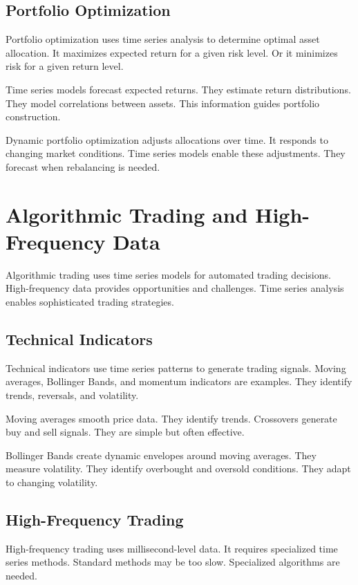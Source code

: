 \subsection{Portfolio Optimization}

Portfolio optimization uses time series analysis to determine optimal asset allocation. It maximizes expected return for a given risk level. Or it minimizes risk for a given return level.

Time series models forecast expected returns. They estimate return distributions. They model correlations between assets. This information guides portfolio construction.

Dynamic portfolio optimization adjusts allocations over time. It responds to changing market conditions. Time series models enable these adjustments. They forecast when rebalancing is needed.

\section{Algorithmic Trading and High-Frequency Data}

Algorithmic trading uses time series models for automated trading decisions. High-frequency data provides opportunities and challenges. Time series analysis enables sophisticated trading strategies.

\subsection{Technical Indicators}

Technical indicators use time series patterns to generate trading signals. Moving averages, Bollinger Bands, and momentum indicators are examples. They identify trends, reversals, and volatility.

Moving averages smooth price data. They identify trends. Crossovers generate buy and sell signals. They are simple but often effective.

Bollinger Bands create dynamic envelopes around moving averages. They measure volatility. They identify overbought and oversold conditions. They adapt to changing volatility.

\subsection{High-Frequency Trading}

High-frequency trading uses millisecond-level data. It requires specialized time series methods. Standard methods may be too slow. Specialized algorithms are needed.

